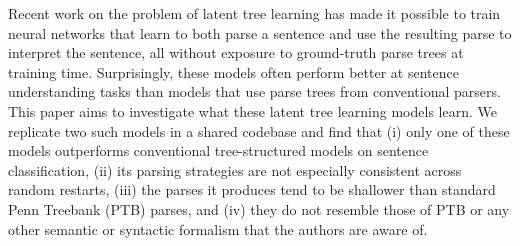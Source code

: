 Recent work on the problem of latent tree learning has made it possible to train neural networks that learn to both parse a sentence and use the resulting parse to interpret the sentence, all without exposure to ground-truth parse trees at training time. Surprisingly, these models often perform better at sentence understanding tasks than models that use parse trees from conventional parsers. This paper aims to investigate what these latent tree learning models learn. We replicate two such models in a shared codebase and find that (i) only one of these models outperforms conventional tree-structured models on sentence classification, (ii) its parsing strategies are not especially consistent across random restarts, (iii) the parses it produces tend to be shallower than standard Penn Treebank (PTB) parses, and (iv) they do not resemble those of PTB or any other semantic or syntactic formalism that the authors are aware of.
